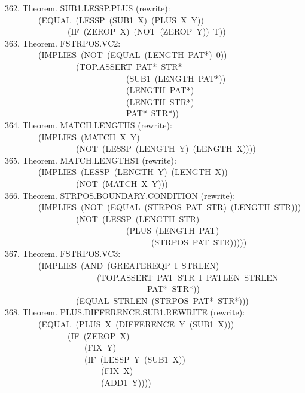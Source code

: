 \documentclass[10pt]{book}
\newenvironment{pubasis}{\begin{flushleft}}{\end{flushleft}}
\begin{document}
\begin{pubasis}
362.    Theorem.  SUB1.LESSP.PLUS (rewrite):\\
~~~~~~~~(EQUAL~(LESSP~(SUB1~X)~(PLUS~X~Y))\\
~~~~~~~~~~~~~~~(IF~(ZEROP~X)~(NOT~(ZEROP~Y))~T))\\

363.    Theorem.  FSTRPOS.VC2:\\
~~~~~~~~(IMPLIES~(NOT~(EQUAL~(LENGTH~PAT*)~0))\\
~~~~~~~~~~~~~~~~~(TOP.ASSERT~PAT*~STR*\\
~~~~~~~~~~~~~~~~~~~~~~~~~~~~~(SUB1~(LENGTH~PAT*))\\
~~~~~~~~~~~~~~~~~~~~~~~~~~~~~(LENGTH~PAT*)\\
~~~~~~~~~~~~~~~~~~~~~~~~~~~~~(LENGTH~STR*)\\
~~~~~~~~~~~~~~~~~~~~~~~~~~~~~PAT*~STR*))\\

364.    Theorem.  MATCH.LENGTHS (rewrite):\\
~~~~~~~~(IMPLIES~(MATCH~X~Y)\\
~~~~~~~~~~~~~~~~~(NOT~(LESSP~(LENGTH~Y)~(LENGTH~X))))\\

365.    Theorem.  MATCH.LENGTHS1 (rewrite):\\
~~~~~~~~(IMPLIES~(LESSP~(LENGTH~Y)~(LENGTH~X))\\
~~~~~~~~~~~~~~~~~(NOT~(MATCH~X~Y)))\\

366.    Theorem.  STRPOS.BOUNDARY.CONDITION (rewrite):\\
~~~~~~~~(IMPLIES~(NOT~(EQUAL~(STRPOS~PAT~STR)~(LENGTH~STR)))\\
~~~~~~~~~~~~~~~~~(NOT~(LESSP~(LENGTH~STR)\\
~~~~~~~~~~~~~~~~~~~~~~~~~~~~~(PLUS~(LENGTH~PAT)\\
~~~~~~~~~~~~~~~~~~~~~~~~~~~~~~~~~~~(STRPOS~PAT~STR)))))\\

367.    Theorem.  FSTRPOS.VC3:\\
~~~~~~~~(IMPLIES~(AND~(GREATEREQP~I~STRLEN)\\
~~~~~~~~~~~~~~~~~~~~~~(TOP.ASSERT~PAT~STR~I~PATLEN~STRLEN\\
~~~~~~~~~~~~~~~~~~~~~~~~~~~~~~~~~~PAT*~STR*))\\
~~~~~~~~~~~~~~~~~(EQUAL~STRLEN~(STRPOS~PAT*~STR*)))\\

368.    Theorem.  PLUS.DIFFERENCE.SUB1.REWRITE (rewrite):\\
~~~~~~~~(EQUAL~(PLUS~X~(DIFFERENCE~Y~(SUB1~X)))\\
~~~~~~~~~~~~~~~(IF~(ZEROP~X)\\
~~~~~~~~~~~~~~~~~~~(FIX~Y)\\
~~~~~~~~~~~~~~~~~~~(IF~(LESSP~Y~(SUB1~X))\\
~~~~~~~~~~~~~~~~~~~~~~~(FIX~X)\\
~~~~~~~~~~~~~~~~~~~~~~~(ADD1~Y))))\\


\end{pubasis}
\end{document}
